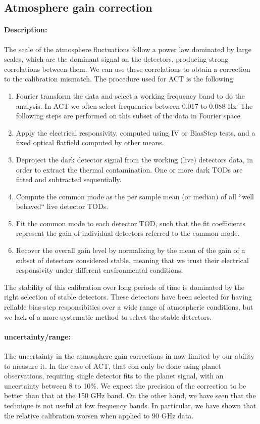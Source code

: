 \subsection{Atmosphere gain correction}

\paragraph{Description:}
The scale of the atmosphere fluctuations follow a power law dominated by large scales, which are the dominant signal on the detectors, producing strong correlations between them. We can use these correlations to obtain a correction to the calibration mismatch. The procedure used for ACT is the following:

\begin{enumerate}
\item Fourier transform the data and select a working frequency band to do the analysis. In ACT we often select frequencies between 0.017 to 0.088 Hz. The following steps are performed on this subset of the data in Fourier space.
\item Apply the electrical responsivity, computed using IV or BiasStep tests, and a fixed optical flatfield computed by other means.
\item Deproject the dark detector signal from the working (live) detectors data, in order to extract the thermal contamination. One or more dark TODs are fitted and subtracted sequentially.
\item Compute the common mode as the per sample mean (or median) of all ``well behaved`` live detector TODs.
\item Fit the common mode to each detector TOD, such that the fit coefficients represent the gain of individual detectors referred to the common mode.
\item Recover the overall gain level by normalizing by the mean of the gain of a subset of detectors considered stable, meaning that we trust their electrical responsivity under different environmental conditions.
\end{enumerate}

The stability of this calibration over long periods of time is dominated by the right selection of stable detectors. These detectors have been selected for having reliable bias-step responsibities over a wide range of atmospheric conditions, but we lack of a more systematic method to select the stable detectors. 

\paragraph{uncertainty/range:}
The uncertainty in the atmosphere gain corrections in now limited by our ability to measure it. In the case of ACT, that con only be done using planet observations, requiring single detector fits to the planet signal, with an uncertainty between 8 to 10\%. We expect the precision of the correction to be better than that at the 150 GHz band. On the other hand, we have seen that the technique is not useful at low frequency bands. In particular, we have shown that the relative calibration worsen when applied to 90 GHz data.

